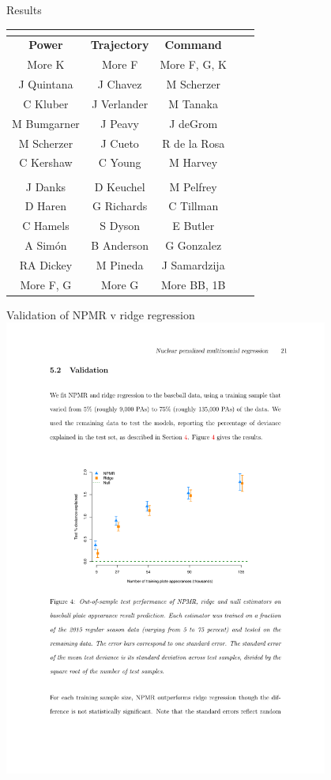 \documentclass[handout]{beamer}
\begin{document}
\begin{frame}{Results}
\begin{tabular}{|c|c|c|c|c|}
\multicolumn{3}{c}{}\\
\hline
{\bf Power} & {\bf Trajectory}  & {\bf Command}\\
\hline
\hline
More K      & More F            & More F, G, K\\
\hline
J Quintana  & J Chavez          & M Scherzer\\
C Kluber    & J Verlander       & M Tanaka\\
M Bumgarner & J Peavy           & J deGrom\\
M Scherzer  & J Cueto           & R de la Rosa\\
C Kershaw   & C Young           & M Harvey\\
            &                   &\\
J Danks     & D Keuchel         & M Pelfrey\\
D Haren     & G Richards        & C Tillman\\
C Hamels    & S Dyson           & E Butler\\
A Sim\'{o}n & B Anderson        & G Gonzalez\\
RA Dickey   & M Pineda          & J Samardzija\\
\hline
More F, G   & More G            & More BB, 1B\\
\hline
\end{tabular}
\end{frame}

\begin{frame}{Validation of NPMR v ridge regression}
\centering
\includegraphics[width = 0.8\textwidth]{figures/baseball_test.pdf}
\end{frame}
\end{document}
